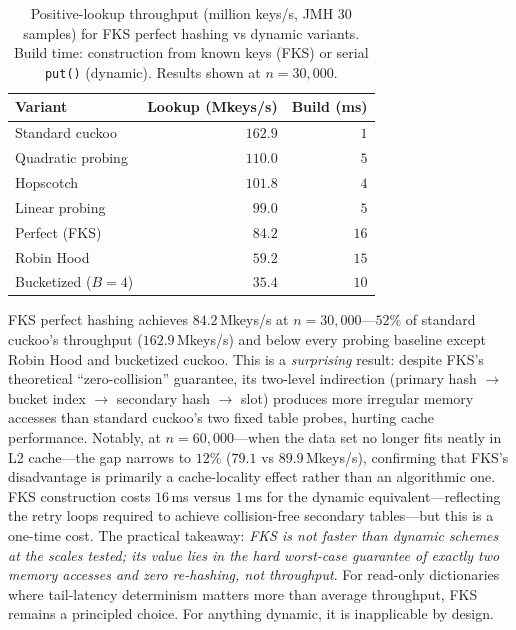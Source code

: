 \documentclass[10pt,journal,compsoc]{IEEEtran}
\begin{document}
\begin{table}[h]
\centering
\caption{Positive-lookup throughput (million keys/s, JMH 30 samples) for FKS perfect hashing vs dynamic variants. Build time: construction from known keys (FKS) or serial \texttt{put()} (dynamic). Results shown at $n=30{,}000$.}
\label{tab:perfect}
\small
\begin{tabular}{@{}lrr@{}}
\toprule
Variant            & Lookup (Mkeys/s) & Build (ms) \\
\midrule
Standard cuckoo    & $162.9$ & $1$  \\
Quadratic probing  & $110.0$ & $5$  \\
Hopscotch          & $101.8$ & $4$  \\
Linear probing     & $\phantom{0}99.0$ & $5$  \\
Perfect (FKS)      & $\phantom{00}84.2$ & $16$ \\
Robin Hood         & $\phantom{00}59.2$ & $15$ \\
Bucketized ($B=4$) & $\phantom{00}35.4$ & $10$ \\
\bottomrule
\end{tabular}
\end{table}

FKS perfect hashing achieves $84.2$\,Mkeys/s at $n{=}30{,}000$---$52\%$ of standard cuckoo's throughput ($162.9$\,Mkeys/s) and below every probing baseline except Robin Hood and bucketized cuckoo. This is a \emph{surprising} result: despite FKS's theoretical ``zero-collision'' guarantee, its two-level indirection (primary hash $\to$ bucket index $\to$ secondary hash $\to$ slot) produces more irregular memory accesses than standard cuckoo's two fixed table probes, hurting cache performance. Notably, at $n{=}60{,}000$---when the data set no longer fits neatly in L2 cache---the gap narrows to $12\%$ ($79.1$ vs $89.9$\,Mkeys/s), confirming that FKS's disadvantage is primarily a cache-locality effect rather than an algorithmic one. FKS construction costs $16$\,ms versus $1$\,ms for the dynamic equivalent---reflecting the retry loops required to achieve collision-free secondary tables---but this is a one-time cost. The practical takeaway: \emph{FKS is not faster than dynamic schemes at the scales tested; its value lies in the hard worst-case guarantee of exactly two memory accesses and zero re-hashing, not throughput}. For read-only dictionaries where tail-latency determinism matters more than average throughput, FKS remains a principled choice. For anything dynamic, it is inapplicable by design.
\end{document}
